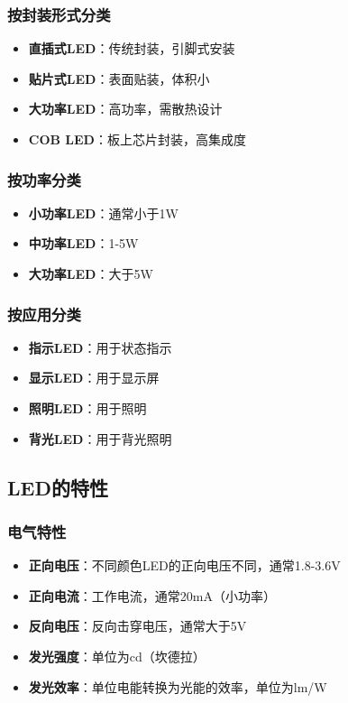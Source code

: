 \subsubsection{按封装形式分类}
\begin{itemize}
    \item \textbf{直插式LED}：传统封装，引脚式安装
    \item \textbf{贴片式LED}：表面贴装，体积小
    \item \textbf{大功率LED}：高功率，需散热设计
    \item \textbf{COB LED}：板上芯片封装，高集成度
\end{itemize}

\subsubsection{按功率分类}
\begin{itemize}
    \item \textbf{小功率LED}：通常小于1W
    \item \textbf{中功率LED}：1-5W
    \item \textbf{大功率LED}：大于5W
\end{itemize}

\subsubsection{按应用分类}
\begin{itemize}
    \item \textbf{指示LED}：用于状态指示
    \item \textbf{显示LED}：用于显示屏
    \item \textbf{照明LED}：用于照明
    \item \textbf{背光LED}：用于背光照明
\end{itemize}

\subsection{LED的特性}

\subsubsection{电气特性}
\begin{itemize}
    \item \textbf{正向电压}：不同颜色LED的正向电压不同，通常1.8-3.6V
    \item \textbf{正向电流}：工作电流，通常20mA（小功率）
    \item \textbf{反向电压}：反向击穿电压，通常大于5V
    \item \textbf{发光强度}：单位为cd（坎德拉）
    \item \textbf{发光效率}：单位电能转换为光能的效率，单位为lm/W
\end{itemize}

